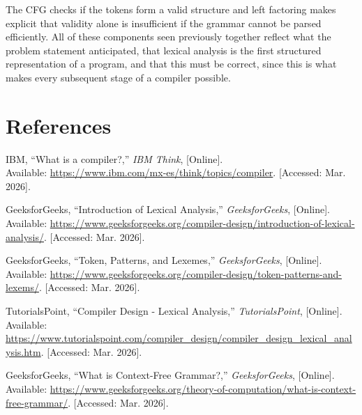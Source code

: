 \documentclass[letterpaper,12pt,oneside]{article}
\begin{document}
The CFG checks if the tokens form a valid structure and left factoring makes explicit that validity alone is insufficient if the grammar cannot be parsed efficiently. All of these components seen previously together reflect what the problem statement anticipated, that lexical analysis is the first structured representation of a program, and that this must be correct, since this is what makes every subsequent stage of a compiler possible.

\section{References}

\noindent [1] IBM, ``What is a compiler?,'' \textit{IBM Think}, [Online].\\
Available: \url{https://www.ibm.com/mx-es/think/topics/compiler}. [Accessed: Mar. 2026].

\vspace{6pt}
\noindent [2] GeeksforGeeks, ``Introduction of Lexical Analysis,'' \textit{GeeksforGeeks}, [Online].\\
Available: \url{https://www.geeksforgeeks.org/compiler-design/introduction-of-lexical-analysis/}. [Accessed: Mar. 2026].

\vspace{6pt}
\noindent [3] GeeksforGeeks, ``Token, Patterns, and Lexemes,'' \textit{GeeksforGeeks}, [Online].\\
Available: \url{https://www.geeksforgeeks.org/compiler-design/token-patterns-and-lexems/}. [Accessed: Mar. 2026].

\vspace{6pt}
\noindent [4] TutorialsPoint, ``Compiler Design - Lexical Analysis,'' \textit{TutorialsPoint}, [Online].\\
Available: \url{https://www.tutorialspoint.com/compiler_design/compiler_design_lexical_analysis.htm}. [Accessed: Mar. 2026].

\vspace{6pt}
\noindent [5] GeeksforGeeks, ``What is Context-Free Grammar?,'' \textit{GeeksforGeeks}, [Online].\\
Available: \url{https://www.geeksforgeeks.org/theory-of-computation/what-is-context-free-grammar/}. [Accessed: Mar. 2026].
\end{document}
